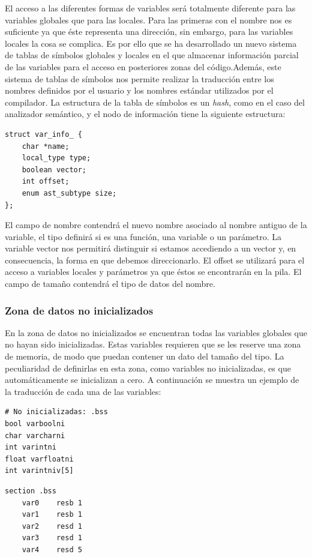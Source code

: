 \documentclass[a4paper,10pt]{article}
\begin{document}
El acceso a las diferentes formas de variables será totalmente diferente para las variables globales que para las locales. Para las primeras con el nombre nos es suficiente ya que éste representa una dirección, sin embargo, para las variables locales la cosa se complica. Es por ello que se ha desarrollado un nuevo sistema de tablas de símbolos globales y locales en el que almacenar información parcial de las variables para el acceso en posteriores zonas del código.Además, este sistema de tablas de símbolos nos permite realizar la traducción entre los nombres definidos por el usuario y los nombres estándar utilizados por el compilador. La estructura de la tabla de símbolos es un \textit{hash}, como en el caso del analizador semántico, y el nodo de información tiene la siguiente estructura:

\begin{lstlisting}
struct var_info_ {
	char *name;
	local_type type;
	boolean vector;
	int offset;
	enum ast_subtype size;
};
\end{lstlisting}

El campo de nombre contendrá el nuevo nombre asociado al nombre antiguo de la variable, el tipo definirá si es una función, una variable o un parámetro. La variable vector nos permitirá distinguir si estamos accediendo a un vector y, en consecuencia, la forma en que debemos direccionarlo. El offset se utilizará para el acceso a variables locales y parámetros ya que éstos se encontrarán en la pila. El campo de tamaño contendrá el tipo de datos del nombre.

\subsubsection{Zona de datos no inicializados}
En la zona de datos no inicializados se encuentran todas las variables globales que no hayan sido inicializadas. Estas variables requieren que se les reserve una zona de memoria, de modo que puedan contener un dato del tamaño del tipo. La peculiaridad de definirlas en esta zona, como variables no inicializadas, es que automáticamente se inicializan a cero. A continuación se muestra un ejemplo de la traducción de cada una de las variables:
\begin{multicols}{2}
\begin{lstlisting}[language=jam,frame=single]
# No inicializadas: .bss
bool varboolni
char varcharni
int varintni
float varfloatni
int varintniv[5]
\end{lstlisting}

\begin{lstlisting}[frame=single]
section .bss
	var0	resb 1
	var1	resb 1
	var2	resd 1
	var3	resd 1
	var4	resd 5
\end{lstlisting}
\end{multicols}
\end{document}
